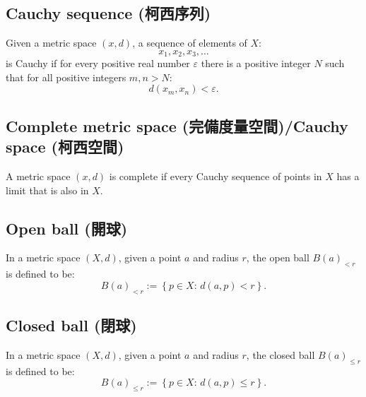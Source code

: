 \documentclass[a4paper,12pt]{article}
\begin{document}
\subsection{Cauchy sequence (柯西序列)}
Given a metric space $(x,d)$, a sequence of elements of $X$:
\[x_1,x_2,x_3,\ldots\]
is Cauchy if for every positive real number $\varepsilon$ there is a positive integer $N$ such that for all positive integers $m,n>N$:
\[d\left(x_m,x_n\right)<\varepsilon.\]
\subsection{Complete metric space (完備度量空間)/Cauchy space (柯西空間)}
A metric space $(x,d)$ is complete if every Cauchy sequence of points in $X$ has a limit that is also in $X$.
\subsection{Open ball (開球)}
In a metric space $(X,d)$, given a point $a$ and radius $r$, the open ball $B(a)_{<r}$ is defined to be:
\[B(a)_{<r}:=\left\{p\in X:\, d(a,p)<r\right\}.\]
\subsection{Closed ball (閉球)}
In a metric space $(X,d)$, given a point $a$ and radius $r$, the closed ball $B(a)_{\leq r}$ is defined to be:
\[B(a)_{\leq r}:=\left\{p\in X:\, d(a,p)\leq r\right\}.\]
\end{document}
